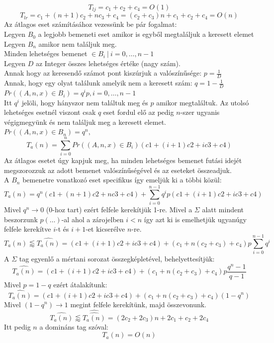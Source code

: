 \documentclass{article}
\theoremstyle{mytheoremstyle}
\theoremstyle{mytheoremstyle}
\theoremstyle{myproblemstyle}
\begin{document}
$$T_{lj} = c_1+c_2+c_4 = O(1)$$
$$T_{lr} = c_1+(n+1)c_2+nc_3+c_4=(c_2+c_3)n+c_1+c_2+c_4=O(n)$$
Az átlagos eset számításához vezessünk be pár fogalmat:\\
Legyen $B_0$ a legjobb bemeneti eset amikor is egyből megtaláljuk a keresett elemet\\
Legyen $B_n$ amikor nem találjuk meg.\\
Minden lehetséges bemenet $\in B_i\ |\ i=0,\ldots,n-1$ \\
Legyen $D$ az Integer összes lehetséges értéke (nagy szám).\\
Annak hogy az keresendő számot pont kiszúrjuk a valószínűsége: $p=\frac{1}{D}$\\
Annak, hogy egy olyat találunk amelyik nem a keresett szám: $q=1-\frac{1}{D}$\\
$Pr((A,n,x)\in B_i) = q^ip, i=0,\ldots,n-1$\\
Itt $q^i$ jelöli, hogy hányszor nem találtuk meg és $p$ amikor megtaláltuk.
Az utolsó lehetséges esetnél viszont csak $q$ eset fordul elő az pedig $n$-szer
ugyanis végigmegyünk és nem találjuk meg a keresett elemet.
$Pr((A,n,x)\in B_n) = q^n, $\\

$$T_a(n) = \sum_{i=0}^n  Pr((A,n,x)\in B_i)(c1 + (i+1)c2 +ic3 +c4)$$
Az átlagos esetet úgy kapjuk meg, ha minden lehetséges bemenet futási idejét
megszorozzuk az adott bemenet valószínűségével és az eseteket összeadjuk.\\
A $B_n$ bemenetre vonatkozó eset specifikus így emeljük ki a többi közül:
$$T_a(n) = q^n(c1 + (n+1)c2 +nc3 +c4)+\sum_{i=0}^{n-1} q^ip(c1 + (i+1)c2 +ic3 +c4)$$
Mivel $q^n\to0$ (0-hoz tart) ezért felfele kerekítjük 1-re.
Mivel a $\Sigma$ alatt mindent beszorzunk
$p(\ldots)$-al ahol a zárojelben $i<n$ így azt ki is emelhetjük ugyanúgy felfele
kerekítve $i$-t és $i+1$-et kicserélve $n$-re.
$$T_a(n)\lessapprox\hat{T_a(n)}=(c1+(i+1)c2+ic3+c4)+(c_1+n(c_2+c_3)+c_4)p\sum_{i=0}^{n-1}q^i$$
A $\Sigma$ tag egyenlő a mértani sorozat összegképletével, behelyettesítjük:
$$\hat{T_a(n)}=(c1+(i+1)c2+ic3+c4)+(c_1+n(c_2+c_3)+c_4)p\frac{q^n-1}{q-1}$$
Mivel $p=1-q$ ezért átalakítunk:
$$\hat{T_a(n)}=(c1+(i+1)c2+ic3+c4)+(c_1+n(c_2+c_3)+c_4)(1-q^n)$$
Mivel $(1-q^n)\to1$ megint felfele kerekítünk, majd összevonunk.
$$\hat{T_a(n)}\lessapprox\hat{\hat{T_a(n)}}=(2c_2+2c_3)n+2c_1+c_2+2c_4$$
Itt pedig $n$ a domináns tag szóval:
$$T_a(n)=O(n)$$
\end{document}
